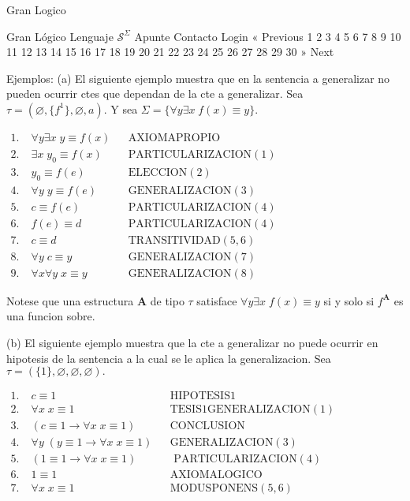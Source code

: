 Gran Logico

Gran Lógico
Lenguaje \(\mathcal{S}^{\Sigma }\)
Apunte
Contacto
Login
« Previous
1
2
3
4
5
6
7
8
9
10
11
12
13
14
15
16
17
18
19
20
21
22
23
24
25
26
27
28
29
30
» Next

Ejemplos: (a) El siguiente ejemplo muestra que en la sentencia a generalizar no pueden ocurrir ctes que dependan de la cte a generalizar. Sea \(\tau =(\varnothing ,\{f^{1}\},\varnothing ,a).\) Y sea \(\Sigma =\{\forall y\exists x\;f(x)\equiv y\}.\)

\( \begin{array}{llll} 1.\; & \forall y\exists x\;y\equiv f(x) & & \text{AXIOMAPROPIO} \\ 2.\; & \exists x\;y_{0}\equiv f(x) & & \text{PARTICULARIZACION}(1) \\ 3.\; & y_{0}\equiv f(e) & & \text{ELECCION}(2) \\ 4.\; & \forall y\;y\equiv f(e) & & \text{GENERALIZACION}(3) \\ 5. & c\equiv f(e) & & \text{PARTICULARIZACION}(4) \\ 6. & f(e)\equiv d & & \text{PARTICULARIZACION}(4) \\ 7. & c\equiv d & & \text{TRANSITIVIDAD}(5,6) \\ 8. & \forall y\;c\equiv y & & \text{GENERALIZACION}(7) \\ 9. & \forall x\forall y\;x\equiv y & & \text{GENERALIZACION}(8) \end{array} \)

Notese que una estructura \(\mathbf{A}\) de tipo \(\tau \) satisface \( \forall y\exists x\;f(x)\equiv y\) si y solo si \(f^{\mathbf{A}}\) es una funcion sobre.

(b) El siguiente ejemplo muestra que la cte a generalizar no puede ocurrir en hipotesis de la sentencia a la cual se le aplica la generalizacion. Sea \( \tau =(\{1\},\varnothing ,\varnothing ,\varnothing ).\)

\( \begin{array}{llll} 1.\; & c\equiv 1 & & \text{HIPOTESIS}1 \\ 2.\; & \forall x\;x\equiv 1 & & \text{TESIS}1\text{GENERALIZACION}(1) \\ 3.\; & (c\equiv 1\rightarrow \forall x\;x\equiv 1) & & \text{CONCLUSION} \\ 4.\; & \forall y\;\left( y\equiv 1\rightarrow \forall x\;x\equiv 1\right) & & \text{GENERALIZACION}(3) \\ 5.\; & \left( 1\equiv 1\rightarrow \forall x\;x\equiv 1\right) & & \text{ PARTICULARIZACION}(4) \\ 6. & 1\equiv 1 & & \text{AXIOMALOGICO} \\ 7. & \forall x\;x\equiv 1 & & \text{MODUSPONENS}(5,6) \end{array} \)

